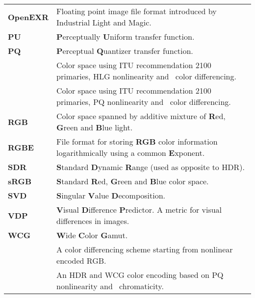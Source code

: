 \begin{flushleft}
\begin{longtable}[c]{@{}p{28.5mm}@{} p{120.5mm}}
	\textbf{OpenEXR}& Floating point image file format introduced by Industrial Light and Magic.\\
	\textbf{PU}	    & \textbf{P}erceptually \textbf{U}niform transfer function.\\
	\textbf{PQ}	    & \textbf{P}erceptual \textbf{Q}uantizer transfer function.\\
	\textbf{\RecTTBBC}& Color space using ITU recommendation 2100 primaries, HLG nonlinearity and \YCbCr\ color differencing.\\
	\textbf{\RecTTPQ}& Color space using ITU recommendation 2100 primaries, PQ nonlinearity and \YCbCr\ color differencing.\\
	\textbf{RGB}	& Color space spanned by additive mixture of \textbf{R}ed, \textbf{G}reen and \textbf{B}lue light.\\
	\textbf{RGBE}	& File format for storing \textbf{RGB} color information logarithmically using a common \textbf{E}xponent.\\
	\textbf{SDR}	& \textbf{S}tandard \textbf{D}ynamic \textbf{R}ange (used as opposite to HDR).\\ 
	\textbf{sRGB}	& \textbf{S}tandard \textbf{R}ed, \textbf{G}reen and \textbf{B}lue color space.\\
	\textbf{SVD}	& \textbf{S}ingular \textbf{V}alue \textbf{D}ecomposition.\\
	\textbf{VDP}	& \textbf{V}isual \textbf{D}ifference \textbf{P}redictor. A metric for visual differences in images.\\
	\textbf{WCG}	& \textbf{W}ide \textbf{C}olor \textbf{G}amut.\\
	\textbf{\YCbCr} & A color differencing scheme starting from nonlinear encoded RGB.\\
	\textbf{\YuvDP} & An HDR and WCG color encoding based on PQ nonlinearity and \uv\ chromaticity.\\
\end{longtable}
\end{flushleft}
%
%